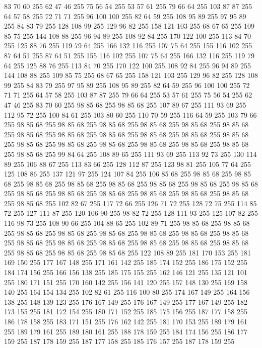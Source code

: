83 70 60 255 62 47 46 255 75 56 54 255 53 57 61 255 79 66 64 255 103 87 87 255 64 57 58 255 72 71 71 255 96 100 100 255 82 64 59 255 108 95 89 255 97 95 89 255 84 83 79 255 128 108 99 255 129 96 82 255 158 121 103 255 68 67 65 255 109 85 75 255 144 108 88 255 96 94 89 255 108 92 84 255 170 122 100 255 113 84 70 255 125 88 76 255 119 79 64 255 166 132 116 255 107 75 64 255 155 116 102 255 87 64 51 255 87 64 51 255 155 116 102 255 107 75 64 255 166 132 116 255 119 79 64 255 125 88 76 255 113 84 70 255 170 122 100 255 108 92 84 255 96 94 89 255 144 108 88 255 109 85 75 255 68 67 65 255 158 121 103 255 129 96 82 255 128 108 99 255 84 83 79 255 97 95 89 255 108 95 89 255 82 64 59 255 96 100 100 255 72 71 71 255 64 57 58 255 103 87 87 255 79 66 64 255 53 57 61 255 75 56 54 255 62 47 46 255 83 70 60 255 98 85 68 255 98 85 68 255 107 89 67 255 111 93 69 255 112 95 72 255 100 84 61 255
103 80 60 255 110 70 59 255 116 64 59 255 103 79 66 255 98 85 68 255 98 85 68 255 98 85 68 255 98 85 68 255 98 85 68 255 98 85 68 255 98 85 68 255 98 85 68 255 98 85 68 255 98 85 68 255 98 85 68 255 98 85 68 255 98 85 68 255 98 85 68 255 98 85 68 255 98 85 68 255 98 85 68 255 98 85 68 255 98 85 68 255 99 84 64 255 108 89 65 255 111 93 69 255 113 92 73 255 130 114 89 255 106 88 67 255 113 83 66 255 128 112 87 255 123 98 81 255 105 77 64 255 125 108 86 255 137 121 97 255 124 107 84 255 106 85 68 255 98 85 68 255 98 85 68 255 98 85 68 255 98 85 68 255 98 85 68 255 98 85 68 255 98 85 68 255 98 85 68 255 98 85 68 255 98 85 68 255 98 85 68 255 98 85 68 255 98 85 68 255 98 85 68 255 98 85 68 255 102 82 67 255 117 72 66 255 126 71 72 255 128 72 75 255 114 85 72 255 127 111 87 255 120 106 90 255 98 82 72 255 128 111 93 255 125 107 82 255 116 98 73 255 108 90 66 255
104 88 65 255 102 89 71 255 98 85 68 255 98 85 68 255 98 85 68 255 98 85 68 255 98 85 68 255 98 85 68 255 98 85 68 255 98 85 68 255 98 85 68 255 98 85 68 255 98 85 68 255 98 85 68 255 98 85 68 255 98 85 68 255 98 85 68 255 98 85 68 255 98 85 68 255 122 108 89 255 181 170 153 255 181 169 150 255 177 167 148 255 171 161 142 255 185 174 152 255 186 175 152 255 184 174 156 255 166 156 138 255 185 175 155 255 162 146 121 255 135 121 101 255 180 171 151 255 170 160 142 255 156 141 120 255 157 148 130 255 169 158 140 255 164 154 134 255 102 82 61 255 116 100 80 255 174 167 149 255 164 156 138 255 148 139 123 255 176 167 149 255 176 167 149 255 177 167 149 255 182 173 155 255 181 172 154 255 180 171 152 255 185 175 156 255 187 177 158 255 186 178 158 255 183 171 151 255 176 162 142 255 181 170 153 255 189 179 161 255 189 179 161 255 189 180 161 255 188 178 159 255 184 174 156 255 186 177 159 255 187 178 159 255 187 177 158 255 185 176 157 255 187 178 159 255
